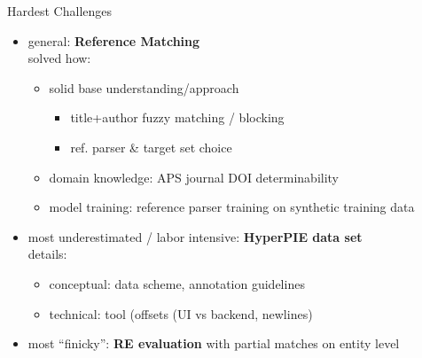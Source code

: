 \documentclass[en,16:9,smallfoot]{sdqbeamer}
\begin{document}
   \begin{frame}{Hardest Challenges}
       \begin{itemize}
           \item general: \textbf{Reference Matching}\\
                 {\color{contextgrey}solved how:}
               \begin{itemize}
                   \item solid base understanding/approach
                   \begin{itemize}
                        \item title+author fuzzy matching / blocking
                        \item ref. parser \& target set choice
                   \end{itemize}
                   \item domain knowledge: APS journal DOI determinability
                   \item model training: reference parser training on synthetic training data
               \end{itemize}
           \item most underestimated / labor intensive: \textbf{HyperPIE data set}\\
                 {\color{contextgrey}details:}
               \begin{itemize}
                   \item conceptual: data scheme,  annotation guidelines
                   \item technical: tool (offsets (UI vs backend, newlines)
               \end{itemize}
           \item most ``finicky'': \textbf{RE evaluation} with partial matches on entity level
       \end{itemize}
   \end{frame}
\end{document}

